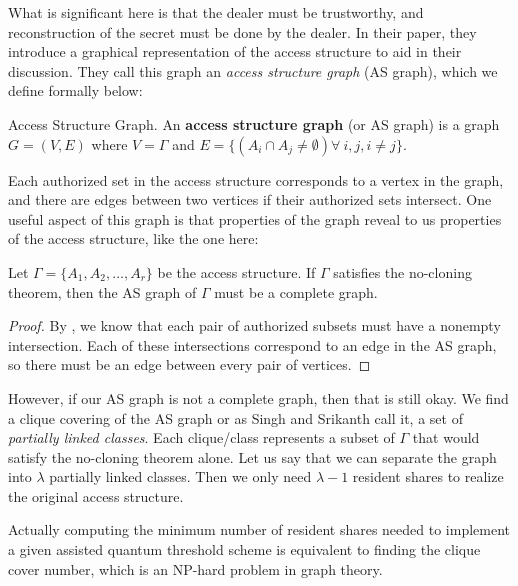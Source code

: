 What is significant here is that the dealer must be trustworthy, and reconstruction of the secret must be done by the dealer. In their paper, they introduce a graphical representation of the access structure to aid in their discussion. They call this graph an \textit{access structure graph} (AS graph), which we define formally below:

\begin{definition}{Access Structure Graph.}
    \label{defn:access-structure-graph}
    An \textbf{access structure graph} (or AS graph) is a graph $G = (V,E)$ where $V = \Gamma$ and $E = \{(A_i \cap A_j \neq \emptyset) \forall\:i,j,i\neq j\}$.
\end{definition}

Each authorized set in the access structure corresponds to a vertex in the graph, and there  are edges between two vertices if their authorized sets intersect. One useful aspect of this graph is that properties of the graph reveal to us properties of the access structure, like the one here:

\begin{proposition}
    \label{prop:complete-as-graph}
    Let $\Gamma = \{A_1,A_2,\dots,A_r\}$ be the access structure. If $\Gamma$ satisfies the no-cloning theorem, then the AS graph of $\Gamma$ must be a complete graph.
\end{proposition}

\begin{proof}
    By , we know that each pair of authorized subsets must have a nonempty intersection. Each of these intersections correspond to an edge in the AS graph, so there must be an edge between every pair of vertices.
\end{proof}

However, if our AS graph is not a complete graph, then that is still okay. We find a clique covering of the AS graph or as Singh and Srikanth call it, a set of \textit{partially linked classes}. Each clique/class represents a subset of $\Gamma$ that would satisfy the no-cloning theorem alone. Let us say that we can separate the graph into $\lambda$ partially linked classes. Then we only need $\lambda - 1$ resident shares to realize the original access structure. 

Actually computing the minimum number of resident shares needed to implement a given assisted quantum threshold scheme is equivalent to finding the clique cover number, which is an NP-hard problem in graph theory.

